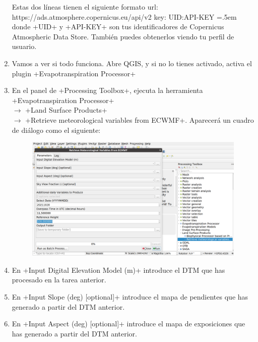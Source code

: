 \documentclass[a4paper,11pt]{article}
\newenvironment{cverbatim}
 {\SaveVerbatim{cverb}}
 {\endSaveVerbatim
  \flushleft\fboxrule=0pt\fboxsep=.5em
  \colorbox{bg}{\BUseVerbatim{cverb}}%
  \endflushleft
}
\begin{document}
\begin{enumerate}
  Estas dos líneas tienen el siguiente formato
  \begin{cverbatim}
   url: https://ads.atmosphere.copernicus.eu/api/v2
   key: UID:API-KEY
  \end{cverbatim}
  donde \cverb+UID+ y \cverb+API-KEY+ son tus identificadores de Copernicus Atmospheric Data Store. También puedes obtenerlos viendo tu perfil de usuario.
  
  \item Vamos a ver si todo funciona. Abre QGIS, y si no lo tienes activado,
activa el plugin \cverb+Evapotranspiration Processor+

  \item En el panel de \cverb+Processing Toolbox+, ejecuta la herramienta \\\cverb+Evapotranspiration Processor+ \\$\rightarrow$ \cverb+Land Surface Products+ \\$\rightarrow$ \cverb+Retrieve meteorological variables from ECWMF+. Aparecerá un cuadro de diálogo como el siguiente:
  \begin{figure}[H]\centering
    \includegraphics[width=\textwidth]{qgis_ecmwf}
  \end{figure}
  
  \item En \cverb+Input Digital Elevation Model (m)+ introduce el DTM que has procesado en la tarea anterior.
  
  \item En \cverb+Input Slope (deg) [optional]+ introduce el mapa de pendientes que has generado a partir del DTM anterior.
  
  \item En \cverb+Input Aspect (deg) [optional]+ introduce el mapa de exposiciones que has generado a partir del DTM anterior.
  

\end{enumerate}
\end{document}
